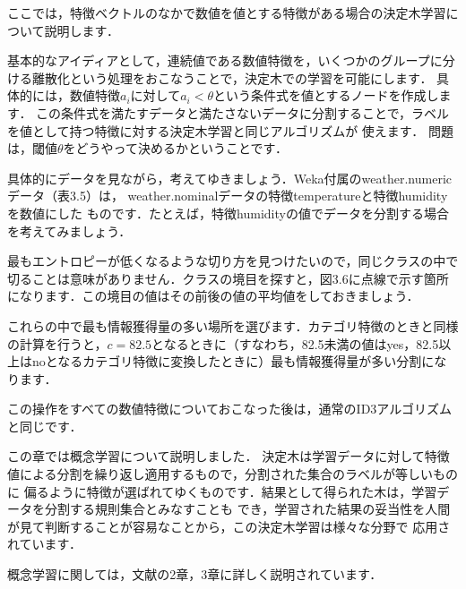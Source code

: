 
ここでは，特徴ベクトルのなかで数値を値とする特徴がある場合の決定木学習について説明します．

基本的なアイディアとして，連続値である数値特徴を，いくつかのグループに分ける離散化という処理をおこなうことで，決定木での学習を可能にします．
具体的には，数値特徴$a_i$に対して$a_i < \theta$という条件式を値とするノードを作成します．
この条件式を満たすデータと満たさないデータに分割することで，ラベルを値として持つ特徴に対する決定木学習と同じアルゴリズムが
使えます．
問題は，閾値$\theta$をどうやって決めるかということです．

具体的にデータを見ながら，考えてゆきましょう．Weka付属のweather.numericデータ（表3.5）は，
weather.nominalデータの特徴temperatureと特徴humidityを数値にした
ものです．たとえば，特徴humidityの値でデータを分割する場合を考えてみましょう．

最もエントロピーが低くなるような切り方を見つけたいので，同じクラスの中で切ることは意味がありません．クラスの境目を探すと，図3.6に点線で示す箇所になります．この境目の値はその前後の値の平均値をしておきましょう．

これらの中で最も情報獲得量の多い場所を選びます．カテゴリ特徴のときと同様の計算を行うと，$c=82.5$となるときに（すなわち，82.5未満の値はyes，82.5以上はnoとなるカテゴリ特徴に変換したときに）最も情報獲得量が多い分割になります．

この操作をすべての数値特徴についておこなった後は，通常のID3アルゴリズムと同じです．


この章では概念学習について説明しました．
決定木は学習データに対して特徴値による分割を繰り返し適用するもので，分割された集合のラベルが等しいものに
偏るように特徴が選ばれてゆくものです．結果として得られた木は，学習データを分割する規則集合とみなすことも
でき，学習された結果の妥当性を人間が見て判断することが容易なことから，この決定木学習は様々な分野で
応用されています．

概念学習に関しては，文献\cite{mitchell97}の2章，3章に詳しく説明されています．

